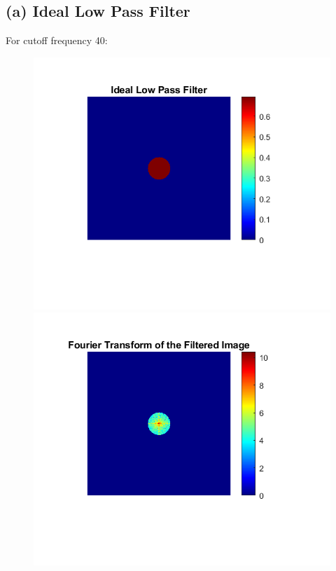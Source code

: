 \documentclass{article}
\begin{document}
\vspace{-10pt}

\subsection*{(a) Ideal Low Pass Filter}

For cutoff frequency 40:

\begin{figure}[!htb]
    \centering
    \begin{minipage}[b]{0.3\textwidth}
        \includegraphics[width=\textwidth]{Ideal_Low_Pass_Filter.png}
    \end{minipage}
    \begin{minipage}[b]{0.3\textwidth}
        \includegraphics[width=\textwidth]{Fourier_Transform_Filtered.png}

\end{minipage}
\end{figure}
\end{document}
